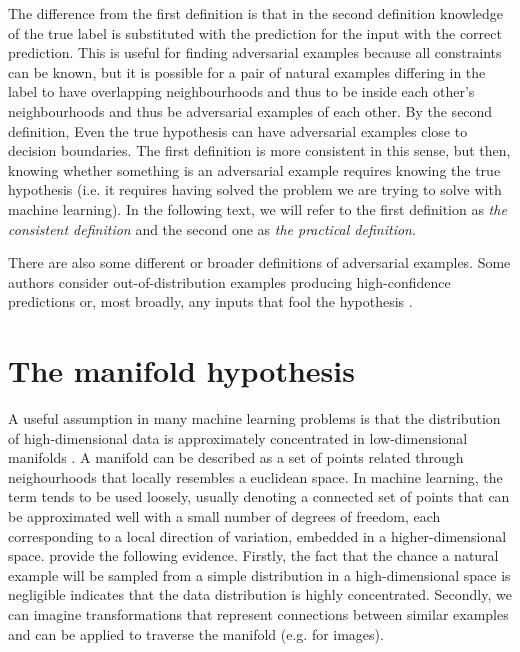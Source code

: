 \documentclass[oneside]{book}
\begin{document}
The difference from the first definition is that in the second definition knowledge of the true label is substituted with the prediction for the input with the correct prediction. This is useful for finding adversarial examples because all constraints can be known, but it is possible for a pair of natural examples differing in the label to have overlapping neighbourhoods and thus to be inside each other's neighbourhoods and thus be adversarial examples of each other. By the second definition, Even the true hypothesis can have adversarial examples close to decision boundaries. The first definition is more consistent in this sense, but then, knowing whether something is an adversarial example requires knowing the true hypothesis (i.e. it requires having solved the problem we are trying to solve with machine learning). In the following text, we will refer to the first definition as \textit{the consistent definition} and the second one as \textit{the practical definition}.

There are also some different or broader definitions of adversarial examples. Some authors consider out-of-distribution examples producing high-confidence predictions \citep{Gal:2018:SCIMHNAETESBNN} or, most broadly, any inputs that fool the hypothesis \citep{Brown:2018:UAE}.


\section{The manifold hypothesis}

A useful assumption in many machine learning problems is that the distribution of high-dimensional data is approximately concentrated in low-dimensional manifolds \citep{Goodfellow:2016:DL}. A manifold can be described as a set of points related through neighourhoods that locally resembles a euclidean space. In machine learning, the term tends to be used loosely, usually denoting a connected set of points that can be approximated well with a small number of degrees of freedom, each corresponding to a local direction of variation, embedded in a higher-dimensional space. 
\citep{Goodfellow:2016:DL} provide the following evidence. Firstly, the fact that the chance a natural example will be sampled from a simple distribution in a high-dimensional space is negligible indicates that the data distribution is highly concentrated. Secondly, we can imagine transformations that represent connections between similar examples and can be applied to traverse the manifold (e.g. for images). 
\end{document}
